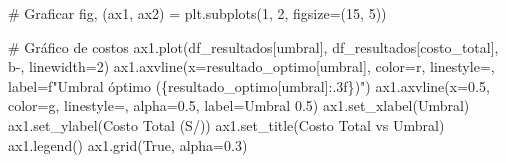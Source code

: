 \documentclass[
  doc,
  floatsintext,
  longtable,
  a4paper,
  nolmodern,
  notxfonts,
  notimes,
  12pt,
  colorlinks=true,linkcolor=blue,citecolor=blue,urlcolor=blue]{apa7}
\newenvironment{Shaded}{\begin{snugshade}}{\end{snugshade}}
\newcommand{\CommentTok}[1]{\textcolor[rgb]{0.37,0.37,0.37}{#1}}
\newcommand{\DecValTok}[1]{\textcolor[rgb]{0.68,0.00,0.00}{#1}}
\newcommand{\FloatTok}[1]{\textcolor[rgb]{0.68,0.00,0.00}{#1}}
\newcommand{\NormalTok}[1]{\textcolor[rgb]{0.00,0.23,0.31}{#1}}
\newcommand{\OperatorTok}[1]{\textcolor[rgb]{0.37,0.37,0.37}{#1}}
\newcommand{\SpecialCharTok}[1]{\textcolor[rgb]{0.37,0.37,0.37}{#1}}
\newcommand{\SpecialStringTok}[1]{\textcolor[rgb]{0.13,0.47,0.30}{#1}}
\newcommand{\StringTok}[1]{\textcolor[rgb]{0.13,0.47,0.30}{#1}}
\newcommand{\VariableTok}[1]{\textcolor[rgb]{0.07,0.07,0.07}{#1}}
\begin{document}
\begin{Shaded}
\begin{Highlighting}[]
\CommentTok{\# Graficar}
\NormalTok{fig, (ax1, ax2) }\OperatorTok{=}\NormalTok{ plt.subplots(}\DecValTok{1}\NormalTok{, }\DecValTok{2}\NormalTok{, figsize}\OperatorTok{=}\NormalTok{(}\DecValTok{15}\NormalTok{, }\DecValTok{5}\NormalTok{))}

\CommentTok{\# Gráfico de costos}
\NormalTok{ax1.plot(df\_resultados[}\StringTok{\textquotesingle{}umbral\textquotesingle{}}\NormalTok{], df\_resultados[}\StringTok{\textquotesingle{}costo\_total\textquotesingle{}}\NormalTok{], }\StringTok{\textquotesingle{}b{-}\textquotesingle{}}\NormalTok{, linewidth}\OperatorTok{=}\DecValTok{2}\NormalTok{)}
\NormalTok{ax1.axvline(x}\OperatorTok{=}\NormalTok{resultado\_optimo[}\StringTok{\textquotesingle{}umbral\textquotesingle{}}\NormalTok{], color}\OperatorTok{=}\StringTok{\textquotesingle{}r\textquotesingle{}}\NormalTok{, linestyle}\OperatorTok{=}\StringTok{\textquotesingle{}{-}{-}\textquotesingle{}}\NormalTok{, }
\NormalTok{            label}\OperatorTok{=}\SpecialStringTok{f"Umbral óptimo (}\SpecialCharTok{\{}\NormalTok{resultado\_optimo[}\StringTok{\textquotesingle{}umbral\textquotesingle{}}\NormalTok{]}\SpecialCharTok{:.3f\}}\SpecialStringTok{)"}\NormalTok{)}
\NormalTok{ax1.axvline(x}\OperatorTok{=}\FloatTok{0.5}\NormalTok{, color}\OperatorTok{=}\StringTok{\textquotesingle{}g\textquotesingle{}}\NormalTok{, linestyle}\OperatorTok{=}\StringTok{\textquotesingle{}{-}{-}\textquotesingle{}}\NormalTok{, alpha}\OperatorTok{=}\FloatTok{0.5}\NormalTok{, label}\OperatorTok{=}\StringTok{\textquotesingle{}Umbral 0.5\textquotesingle{}}\NormalTok{)}
\NormalTok{ax1.set\_xlabel(}\StringTok{\textquotesingle{}Umbral\textquotesingle{}}\NormalTok{)}
\NormalTok{ax1.set\_ylabel(}\StringTok{\textquotesingle{}Costo Total (S/)\textquotesingle{}}\NormalTok{)}
\NormalTok{ax1.set\_title(}\StringTok{\textquotesingle{}Costo Total vs Umbral\textquotesingle{}}\NormalTok{)}
\NormalTok{ax1.legend()}
\NormalTok{ax1.grid(}\VariableTok{True}\NormalTok{, alpha}\OperatorTok{=}\FloatTok{0.3}\NormalTok{)}


\end{Highlighting}
\end{Shaded}
\end{document}
